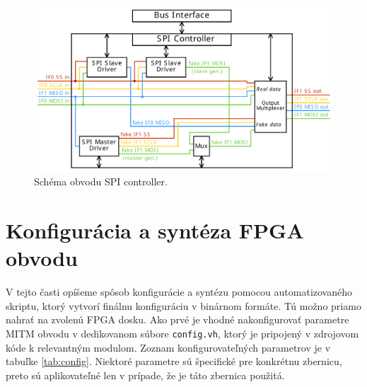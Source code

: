 \begin{figure}
    \centerline{\includegraphics[width=1\textwidth]{images/designs/spiController.pdf}}
    \caption[Schéma obvodu SPI controller]{Schéma obvodu SPI controller.}
    \label{obr:spiController}
\end{figure}

\section{Konfigurácia a syntéza FPGA obvodu} \label{sek:config}
V tejto časti opíšeme spôsob konfigurácie a syntézu pomocou automatizovaného skriptu, ktorý vytvorí finálnu konfiguráciu v binárnom formáte. Tú možno priamo nahrať na zvolenú FPGA dosku. Ako prvé je vhodné nakonfigurovať parametre MITM obvodu v dedikovanom súbore \texttt{config.vh}, ktorý je pripojený v zdrojovom kóde k relevantným modulom. Zoznam konfigurovateľných parametrov je v tabuľke \ref{tab:config}. Niektoré parametre sú špecifické pre konkrétnu zbernicu, preto sú aplikovateľné len v prípade, že je táto zbernica použitá.

